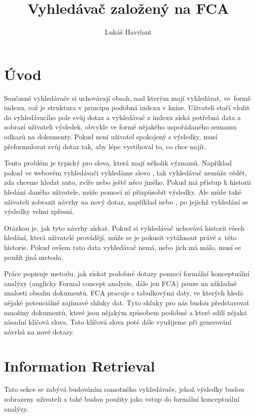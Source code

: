 \documentclass{article}
\title{Vyhledávač založený na FCA}
\author{Lukáš Havrlant}
\begin{document}
\maketitle

\section{Úvod}

Současné vyhledávače si uchovávají obsah, nad kterým mají vyhledávat, ve~formě indexu, což je struktura v principu podobná indexu v knize. Uživateli stačí vložit do vyhledávacího pole svůj dotaz a vyhledávač z indexu získá potřebná data a zobrazí uživateli výsledek, obvykle ve formě nějakého uspořádaného seznamu odkazů na dokumenty. Pokud není uživatel spokojený s výsledky, musí přeformulovat svůj dotaz tak, aby lépe vystihoval to, co chce najít. 

Tento problém je typický pro slova, která mají několik významů. Například pokud ve webovém vyhledávači vyhledáme slovo , tak vyhledávač nemůže vědět, zda chceme hledat auto, zvíře nebo ještě něco jiného. Pokud má přístup k historii hledání daného uživatele, může pomocí ní přizpůsobit výsledky. Ale může také uživateli zobrazit návrhy na nový dotaz, například  nebo , po jejichž vyhledání se výsledky velmi zpřesní. 

Otázkou je, jak tyto návrhy získat. Pokud si vyhledávač uchovává historii všech hledání, která uživatelé provádějí, může se je pokusit vytáhnout právě z~této historie. Pokud ovšem tato data vyhledávač nemá, nebo jich má málo, musí se použít jiná metoda. 

Práce popisuje metodu, jak získat podobné dotazy pomocí formální konceptuální analýzy (anglicky Formal concept analysis, dále jen FCA) pouze na základně znalosti obsahu dokumentů. FCA pracuje s tabulkovými daty, ve kterých hledá nějaké potenciálně zajímavé shluky dat. Tyto shluky pro nás budou představovat množiny dokumentů, které jsou nějakým způsobem podobné a které sdílí nějaká zásadní klíčová slova. Tato klíčová slova poté dále využijeme při generování návrhů na nové dotazy. 

\newpage
\section{Information Retrieval}
Tato sekce se zabývá budováním samotného vyhledávače, jehož výsledky budou zobrazeny uživateli a také budou použity jako vstup do formální konceptuální analýzy. 
\end{document}
